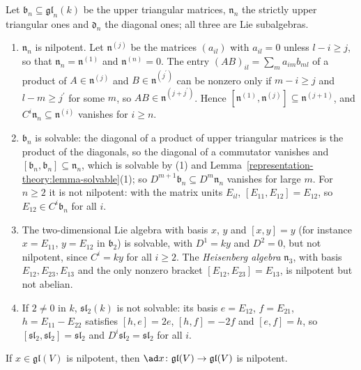 \begin{example}\label{representation-theory:example-triangular}
Let $\mathfrak{b}_n \subseteq \mathfrak{gl}_n(k)$ be the upper triangular matrices, $\mathfrak{n}_n$ the strictly upper triangular ones and $\mathfrak{d}_n$ the diagonal
ones; all three are Lie subalgebras.
\begin{enumerate}
\item $\mathfrak{n}_n$ is nilpotent. Let $\mathfrak{n}^{(j)}$ be the matrices $(a_{il})$ with $a_{il} = 0$ unless $l - i \geq j$, so that
$\mathfrak{n}_n = \mathfrak{n}^{(1)}$ and $\mathfrak{n}^{(n)} = 0$. The entry $(AB)_{il} = \sum_ma_{im}b_{ml}$ of a product of $A \in \mathfrak{n}^{(j)}$ and
$B \in \mathfrak{n}^{(j^{\prime})}$ can be nonzero only if $m - i \geq j$ and $l - m \geq j^{\prime}$ for some $m$, so $AB \in \mathfrak{n}^{(j + j^{\prime})}$. Hence
$[\mathfrak{n}^{(1)}, \mathfrak{n}^{(j)}] \subseteq \mathfrak{n}^{(j+1)}$, and $C^i\mathfrak{n}_n \subseteq \mathfrak{n}^{(i)}$ vanishes for $i \geq n$.
\item $\mathfrak{b}_n$ is solvable: the diagonal of a product of upper triangular matrices is the product of the diagonals, so the diagonal of a commutator vanishes and
$[\mathfrak{b}_n, \mathfrak{b}_n] \subseteq \mathfrak{n}_n$, which is solvable by (1) and Lemma~\ref{representation-theory:lemma-solvable}(1); so
$D^{m+1}\mathfrak{b}_n \subseteq D^m\mathfrak{n}_n$ vanishes for large $m$. For $n \geq 2$ it is not nilpotent: with the matrix units $E_{il}$,
$[E_{11}, E_{12}] = E_{12}$, so $E_{12} \in C^i\mathfrak{b}_n$ for all $i$.
\item The two-dimensional Lie algebra with basis $x$, $y$ and $[x, y] = y$ (for instance $x = E_{11}$, $y = E_{12}$ in $\mathfrak{b}_2$) is solvable, with
$D^1 = ky$ and $D^2 = 0$, but not nilpotent, since $C^i = ky$ for all $i \geq 2$. The \emph{Heisenberg algebra} $\mathfrak{n}_3$, with basis $E_{12}, E_{23}, E_{13}$
and the only nonzero bracket $[E_{12}, E_{23}] = E_{13}$, is nilpotent but not abelian.
\item If $2 \neq 0$ in $k$, $\mathfrak{sl}_2(k)$ is not solvable: its basis $e = E_{12}$, $f = E_{21}$, $h = E_{11} - E_{22}$ satisfies
$[h, e] = 2e$, $[h, f] = -2f$ and $[e, f] = h$, so $[\mathfrak{sl}_2, \mathfrak{sl}_2] = \mathfrak{sl}_2$ and $D^i\mathfrak{sl}_2 = \mathfrak{sl}_2$ for all $i$.
\end{enumerate}
\end{example}

\begin{lemma}\label{representation-theory:lemma-ad-nilpotent}
If $x \in \mathfrak{gl}(V)$ is nilpotent, then $\ad x \colon \mathfrak{gl}(V) \to \mathfrak{gl}(V)$ is nilpotent.
\end{lemma}

